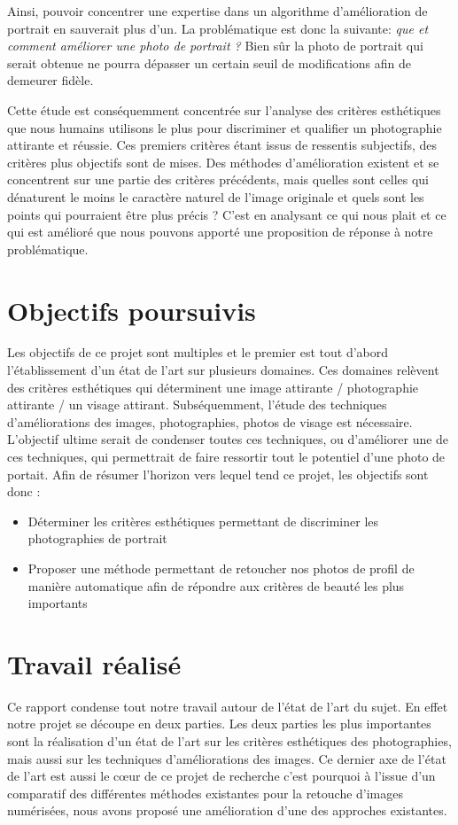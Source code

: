 \documentclass[11pt, french]{report-rd-info}
\begin{document}
Ainsi, pouvoir concentrer une expertise dans un algorithme d'amélioration de portrait en sauverait plus d'un. La problématique est donc la suivante: \emph{que et comment améliorer une photo de portrait ?} Bien sûr la photo de portrait qui serait obtenue ne pourra dépasser un certain seuil de modifications afin de demeurer fidèle.

Cette étude est conséquemment concentrée sur l'analyse des critères esthétiques que nous humains utilisons le plus pour discriminer et qualifier un photographie attirante et réussie. Ces premiers critères étant issus de ressentis subjectifs, des critères plus objectifs sont de mises. 
Des méthodes d'amélioration existent et se concentrent sur une partie des critères précédents, mais quelles sont celles qui dénaturent le moins le caractère naturel de l'image originale et quels sont les points qui pourraient être plus précis ? 
C'est en analysant ce qui nous plait et ce qui est amélioré que nous pouvons apporté une proposition de réponse à notre problématique.

\section{Objectifs poursuivis}
Les objectifs de ce projet sont multiples et le premier est tout d'abord l'établissement d'un état de l'art sur plusieurs domaines. Ces domaines relèvent des critères esthétiques qui déterminent une image attirante / photographie attirante / un visage attirant. Subséquemment, l'étude des techniques d'améliorations des images, photographies, photos de visage est nécessaire. L'objectif ultime serait de condenser toutes ces techniques, ou d'améliorer une de ces techniques, qui permettrait de faire ressortir tout le potentiel d'une photo de portait. Afin de résumer l'horizon vers lequel tend ce projet, les objectifs sont donc :
\begin{itemize}
\item Déterminer les critères esthétiques permettant de discriminer les photographies de portrait
\item Proposer une méthode permettant de retoucher nos photos de profil de manière automatique afin de répondre aux critères de beauté les plus importants 
\end{itemize}


\section{Travail réalisé}
Ce rapport condense tout notre travail autour de l'état de l'art du sujet. En effet notre projet se découpe en deux parties. Les deux parties les plus importantes sont la réalisation d'un état de l'art sur les critères esthétiques des photographies, mais aussi sur les techniques d'améliorations des images. Ce dernier axe de l'état de l'art est aussi le cœur de ce projet de recherche c'est pourquoi à l'issue d'un comparatif des différentes méthodes existantes pour la retouche d'images numérisées, nous avons proposé une amélioration d'une des approches existantes. 
\end{document}
